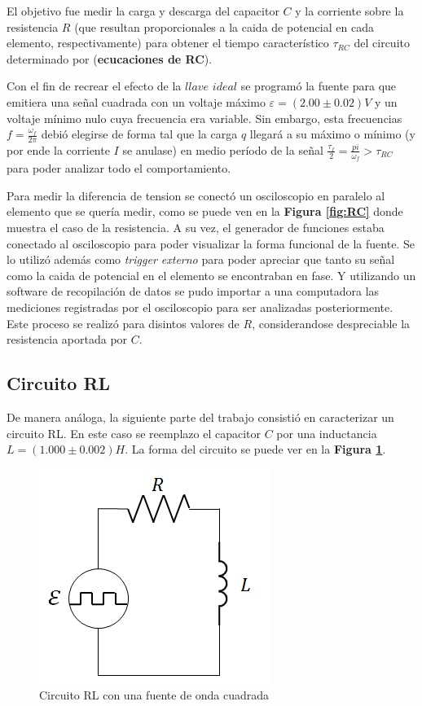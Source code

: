 \documentclass[11pt,a4paper]{article}
\begin{document}
El objetivo fue medir la carga y descarga del capacitor $C$ y la corriente sobre la resistencia $R$ (que resultan proporcionales a la caida de potencial en cada elemento, respectivamente) para obtener el tiempo característico $\tau_{RC}$ del circuito determinado por (\textbf{ecucaciones de RC}).
 
Con el fin de recrear el efecto de la $llave$ $ideal$ se programó la fuente para que emitiera una señal cuadrada con un voltaje máximo $\varepsilon = (2.00 \pm 0.02)V$ y un voltaje mínimo nulo cuya frecuencia era variable. Sin embargo, esta frecuencias $f = \frac{\omega_f}{2\pi}$ debió elegirse de forma tal que la carga $q$ llegará a su máximo o mínimo (y por ende la corriente $I$ se anulase) en medio período de la señal $\frac{\tau_f}{2} = \frac{pi}{\omega_f} > \tau_{RC}$ para poder analizar todo el comportamiento.

Para medir la diferencia de tension se conectó un osciloscopio en paralelo al elemento que se quería medir, como se puede ven en la \textbf{Figura \ref{fig:RC}} donde muestra el caso de la resistencia. A su vez, el generador de funciones estaba conectado al osciloscopio para poder visualizar la forma funcional de la fuente. Se lo utilizó además como \textit{trigger externo} para poder apreciar que tanto su señal como la caida de potencial en el elemento se encontraban en fase. Y utilizando un software de recopilación de datos se pudo importar a una computadora las mediciones registradas por el osciloscopio para ser analizadas posteriormente. Este proceso se realizó para disintos valores de $R$, considerandose despreciable la resistencia aportada por $C$.

\subsection{Circuito RL}

De manera análoga, la siguiente parte del trabajo consistió en caracterizar un circuito RL. En este caso se reemplazo el capacitor $C$ por una inductancia $L = (1.000 \pm 0.002) H$. La forma del circuito se puede ver en la \textbf{Figura \ref{fig:RL}}.

\begin{figure}[h]
\centering
\includegraphics[scale=0.7]{Circuito-RL}
  \caption{Circuito RL con una fuente de onda cuadrada}
  \label{fig:RL}
\end{figure}
\end{document}
